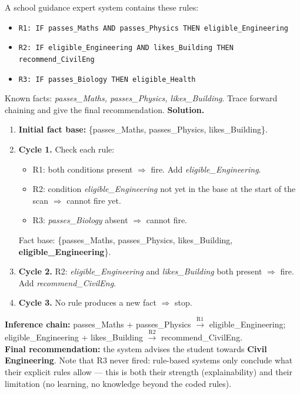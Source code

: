 \documentclass[11pt]{article}
\begin{document}
\begin{exoresolu}
A school guidance expert system contains these rules:
\begin{itemize}
\item \texttt{R1: IF passes\_Maths AND passes\_Physics THEN eligible\_Engineering}
\item \texttt{R2: IF eligible\_Engineering AND likes\_Building THEN recommend\_CivilEng}
\item \texttt{R3: IF passes\_Biology THEN eligible\_Health}
\end{itemize}
Known facts: \emph{passes\_Maths, passes\_Physics, likes\_Building}. Trace forward chaining and give the final recommendation.
\tcblower
\textbf{Solution.}
\begin{enumerate}
\item \textbf{Initial fact base:} \{passes\_Maths, passes\_Physics, likes\_Building\}.
\item \textbf{Cycle 1.} Check each rule:
\begin{itemize}
\item R1: both conditions present $\Rightarrow$ fire. Add \emph{eligible\_Engineering}.
\item R2: condition \emph{eligible\_Engineering} not yet in the base at the start of the scan $\Rightarrow$ cannot fire yet.
\item R3: \emph{passes\_Biology} absent $\Rightarrow$ cannot fire.
\end{itemize}
Fact base: \{passes\_Maths, passes\_Physics, likes\_Building, \textbf{eligible\_Engineering}\}.
\item \textbf{Cycle 2.} R2: \emph{eligible\_Engineering} and \emph{likes\_Building} both present $\Rightarrow$ fire. Add \emph{recommend\_CivilEng}.
\item \textbf{Cycle 3.} No rule produces a new fact $\Rightarrow$ stop.
\end{enumerate}
\textbf{Inference chain:} passes\_Maths + passes\_Physics $\xrightarrow{\text{R1}}$ eligible\_Engineering; eligible\_Engineering + likes\_Building $\xrightarrow{\text{R2}}$ recommend\_CivilEng.\\
\textbf{Final recommendation:} the system advises the student towards \textbf{Civil Engineering}. Note that R3 never fired: rule-based systems only conclude what their explicit rules allow — this is both their strength (explainability) and their limitation (no learning, no knowledge beyond the coded rules).
\end{exoresolu}
\end{document}
